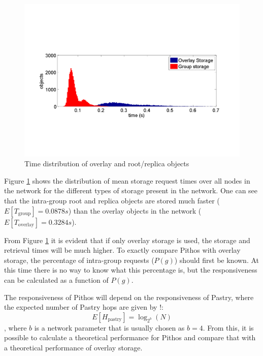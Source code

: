\documentclass[10pt,a4paper,conference]{IEEEtran}
\begin{document}
\begin{figure}[htbp]
 \centering
 \includegraphics[clip=true, viewport=2cm 5cm 27cm 14.5cm, width=\columnwidth]{request_time_distribution}
 \caption{Time distribution of overlay and root/replica objects}
 \label{fig_pithos_response}
\end{figure}
%
Figure \ref{fig_pithos_response} shows the distribution of mean storage request times over all nodes in the network for the different types of
storage present in the network. One can see that the intra-group root and replica objects are stored much faster ($E\left[T_{\textrm{group}}\right] =
0.0878 s$) than the overlay objects in the network ($E\left[T_{\textrm{overlay}}\right] = 0.3284 s$).

From Figure \ref{fig_pithos_response} it is evident that if only overlay storage is used, the storage and retrieval times will be much higher. To
exactly compare Pithos with overlay storage, the percentage of intra-group requests ($P(g)$) should first be known. At this time there is no way to
know what this percentage is, but the responsiveness can be calculated as a function of $P(g)$.

The responsiveness of Pithos will depend on the responsiveness of Pastry, where the expected number of Pastry hops are given by
\cite{storage_and_chaching_PAST}!:
%
\begin{equation}\label{pastry_hops}
    E[H_{\textrm{pastry}}] = \log_{2^b}\left(N\right)
\end{equation}
%
, where $b$ is a network parameter that is usually chosen as $b = 4$. From this, it is possible to calculate a theoretical performance for Pithos and
compare that with a theoretical performance of overlay storage.
\end{document}
